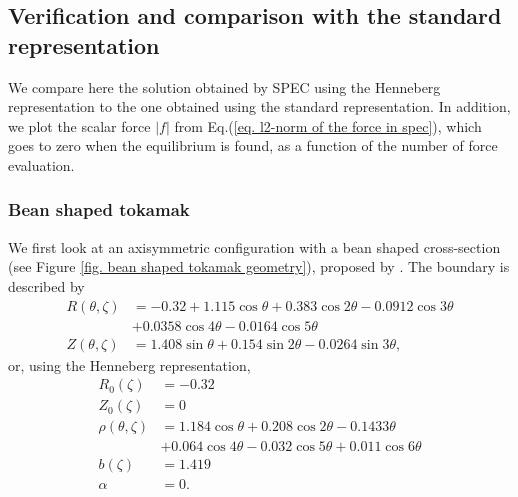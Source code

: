 \documentclass[my_thesis.tex]{subfiles}
\begin{document}
\subsection{Verification and comparison with the standard representation}
We compare here the solution obtained by SPEC using the Henneberg representation to the one obtained using the standard representation. In addition, we plot the scalar force $|f|$ from Eq.(\ref{eq. l2-norm of the force in spec}), which goes to zero when the equilibrium is found, as a function of the number of force evaluation. 

\subsubsection{Bean shaped tokamak}
We first look at an axisymmetric configuration with a bean shaped cross-section (see Figure \ref{fig. bean shaped tokamak geometry}), proposed by \citet{hirshmanOptimizedFourierRepresentations1985}. The boundary is described by
\begin{align}
	R(\theta,\zeta) &= -0.32+1.115\cos\theta+0.383\cos 2\theta-0.0912\cos 3\theta\\
	&+0.0358\cos 4\theta-0.0164\cos 5\theta\\
	Z(\theta,\zeta) &= 1.408\sin\theta +0.154\sin 2\theta-0.0264\sin 3\theta,
\end{align}
or, using the Henneberg representation,
\begin{align}
	R_0(\zeta) &= -0.32\\
	Z_0(\zeta) &=  0\\
	\rho(\theta,\zeta) &= 1.184\cos\theta +0.208\cos 2\theta - 0.143 3\theta \\
	&+ 0.064\cos 4\theta-0.032\cos 5\theta +0.011\cos 6\theta\\
	b(\zeta) &= 1.419\\
	\alpha&=0.
\end{align}
\end{document}
